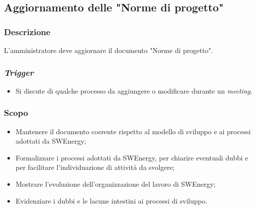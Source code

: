 \subsection{Aggiornamento delle "Norme di progetto"}
\label{aggiornare-ndp}

\subsubsection{Descrizione}

L'amministratore deve aggiornare il documento "Norme di progetto".

\subsubsection{\textit{Trigger}}
\begin{itemize}
	\item Si discute di qualche processo da aggiungere o modificare durante un
	      \textit{meeting}.
\end{itemize}

\subsubsection{Scopo}
\begin{itemize}
	\item Mantenere il documento coerente rispetto al modello di sviluppo e ai
	      processi adottati da SWEnergy;

	\item Formalizzare i processi adottati da SWEnergy, per chiarire eventuali
	      dubbi e per facilitare l'individuazione di attività da svolgere;

	\item Mostrare l'evoluzione dell'organizzazione del lavoro di SWEnergy;

	\item Evidenziare i dubbi e le lacune intestini ai processi di sviluppo.
\end{itemize}

